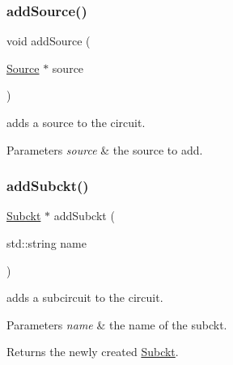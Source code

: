 \subsubsection{\texorpdfstring{add\+Source()}{addSource()}}
{\footnotesize\ttfamily void add\+Source (\begin{DoxyParamCaption}\item[{\mbox{\hyperlink{class_s_p_i_c_e_1_1_source}{Source}} $\ast$}]{source }\end{DoxyParamCaption})\hspace{0.3cm}{\ttfamily [inline]}}



adds a source to the circuit. 


\begin{DoxyParams}{Parameters}
{\em source} & the source to add. \\
\hline
\end{DoxyParams}
\mbox{\label{class_s_p_i_c_e_1_1_circuit_a0d1352e46d4537ce1e5f651de40e91a6}} 
\subsubsection{\texorpdfstring{add\+Subckt()}{addSubckt()}}
{\footnotesize\ttfamily \mbox{\hyperlink{class_s_p_i_c_e_1_1_subckt}{Subckt}} $\ast$ add\+Subckt (\begin{DoxyParamCaption}\item[{std\+::string}]{name }\end{DoxyParamCaption})}



adds a subcircuit to the circuit. 


\begin{DoxyParams}{Parameters}
{\em name} & the name of the subckt.\\
\hline
\end{DoxyParams}
\begin{DoxyReturn}{Returns}
the newly created \mbox{\hyperlink{class_s_p_i_c_e_1_1_subckt}{Subckt}}. 
\end{DoxyReturn}
\mbox{\label{class_s_p_i_c_e_1_1_circuit_a798df9ebd558e22c85eeceb5202e3123}} 
